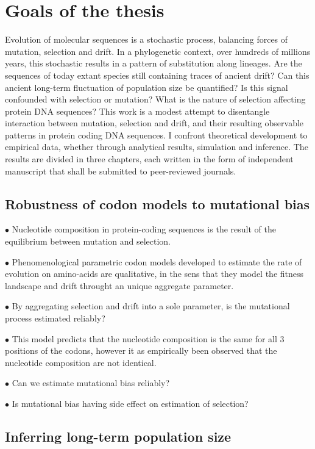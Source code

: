\chapter{Goals of the thesis}
{
	\hypersetup{linkcolor=GREYDARK}
	\minitoc
}
\label{chap:goals}

Evolution of molecular sequences is a stochastic process, balancing forces of mutation, selection and drift.
In a phylogenetic context, over hundreds of millions years, this stochastic results in a pattern of substitution along lineages.
Are the sequences of today extant species still containing traces of ancient drift?
Can this ancient long-term fluctuation of population size be quantified?
Is this signal confounded with selection or mutation?
What is the nature of selection affecting protein DNA sequences?
This work is a modest attempt to disentangle interaction between mutation, selection and drift, and their resulting observable patterns in protein coding DNA sequences.
I confront theoretical development to empirical data, whether through analytical results, simulation and inference.
The results are divided in three chapters, each written in the form of independent manuscript that shall be submitted to peer-reviewed journals.

\section{Robustness of codon models to mutational bias}

$\bullet$ Nucleotide composition in protein-coding sequences is the result of the equilibrium between mutation and selection.

$\bullet$ Phenomenological parametric \gls{codon} models developed to estimate the rate of evolution on amino-acids are qualitative, in the sens that they model the fitness landscape and drift throught an unique aggregate parameter.

$\bullet$ By aggregating selection and drift into a sole parameter, is the mutational process estimated reliably?

$\bullet$ This model predicts that the nucleotide composition is the same for all $3$ positions of the codons, however it as empirically been observed that the nucleotide composition are not identical.

$\bullet$ Can we estimate mutational bias reliably?

$\bullet$ Is mutational bias having side effect on estimation of selection?

\section{Inferring long-term population size}

